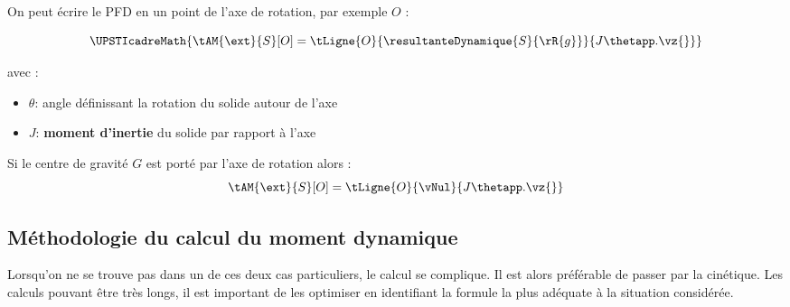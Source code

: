 \documentclass[12pt]{article}
\begin{document}
On peut écrire le PFD en un point de l'axe de rotation, par exemple $O$ :

\[ \UPSTIcadreMath{\tAM{\ext}{S}[O]=\tLigne{O}{\resultanteDynamique{S}{\rR{g}}}{J\thetapp.\vz{}}}\]

\begin{minipage}[c]{0.4\linewidth}
avec :	   
\begin{itemize}
\item $\theta$: angle définissant la rotation du solide  autour de l'axe 
\item $J$: \textbf{moment d'inertie} du solide  par rapport à l'axe 
\end{itemize}
\end{minipage} \hfill
\begin{minipage}[c]{.5\linewidth}
	\centering
{}
\end{minipage} 

\vspace{1em}
Si le centre de gravité $G$ est porté par l'axe de rotation alors : 
\[\tAM{\ext}{S}[O]=\tLigne{O}{\vNul}{J\thetapp.\vz{}}\]

\newpage
\subsection{Méthodologie du calcul du moment dynamique}

Lorsqu'on ne se trouve pas dans un de ces deux cas particuliers, le calcul se complique. Il est alors préférable de passer par la cinétique. Les calculs pouvant être très longs, il est important de les optimiser en identifiant la formule la plus adéquate à la situation considérée.
\end{document}
